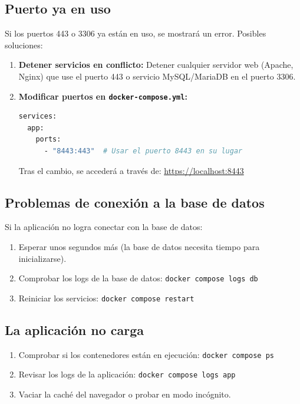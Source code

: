 \subsection{Puerto ya en uso}
Si los puertos 443 o 3306 ya están en uso, se mostrará un error. Posibles soluciones:
\begin{enumerate}
    \item \textbf{Detener servicios en conflicto:} Detener cualquier servidor web (Apache, Nginx) que use el puerto 443 o servicio MySQL/MariaDB en el puerto 3306.
    \item \textbf{Modificar puertos en \texttt{docker-compose.yml}:}
\begin{lstlisting}[language=bash, basicstyle=\ttfamily\small]
services:
  app:
    ports:
      - "8443:443"  # Usar el puerto 8443 en su lugar
\end{lstlisting}
    Tras el cambio, se accederá a través de: \url{https://localhost:8443}
\end{enumerate}

\subsection{Problemas de conexión a la base de datos}
Si la aplicación no logra conectar con la base de datos:
\begin{enumerate}
    \item Esperar unos segundos más (la base de datos necesita tiempo para inicializarse).
    \item Comprobar los logs de la base de datos: \texttt{docker compose logs db}
    \item Reiniciar los servicios: \texttt{docker compose restart}
\end{enumerate}

\subsection{La aplicación no carga}
\begin{enumerate}
    \item Comprobar si los contenedores están en ejecución: \texttt{docker compose ps}
    \item Revisar los logs de la aplicación: \texttt{docker compose logs app}
    \item Vaciar la caché del navegador o probar en modo incógnito.
\end{enumerate}


